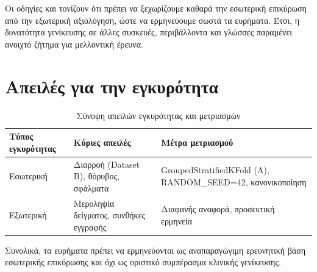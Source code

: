 Οι οδηγίες  \citep{collins2024tripod} και  \citep{moons2025probast} τονίζουν ότι πρέπει να ξεχωρίζουμε καθαρά την εσωτερική επικύρωση από την εξωτερική αξιολόγηση, ώστε να ερμηνεύουμε σωστά τα ευρήματα. 
Έτσι, η δυνατότητα γενίκευσης σε άλλες συσκευές, περιβάλλοντα και γλώσσες παραμένει ανοιχτό ζήτημα για μελλοντική έρευνα.

\section{Απειλές για την εγκυρότητα}

\begin{table}[H]
    \centering
    \caption{Σύνοψη απειλών εγκυρότητας και μετριασμών}
    \label{tab:validity-threats-summary}
    \begin{tabular}{@{}p{2.8cm}p{5.1cm}p{5.1cm}@{}}
        \toprule
        \textbf{Τύπος εγκυρότητας} & \textbf{Κύριες απειλές} & \textbf{Μέτρα μετριασμού} \\
        \midrule
        Εσωτερική & Διαρροή (Dataset B), θόρυβος, σφάλματα & GroupedStratifiedKFold (A), RANDOM\_SEED=42, κανονικοποίηση \\
        Εξωτερική & Μεροληψία δείγματος, συνθήκες εγγραφής & Διαφανής αναφορά, προσεκτική ερμηνεία \\
        \bottomrule
    \end{tabular}
\end{table}

Συνολικά, τα ευρήματα πρέπει να ερμηνεύονται ως αναπαραγώγιμη ερευνητική βάση εσωτερικής επικύρωσης και όχι ως οριστικό συμπέρασμα κλινικής γενίκευσης.
